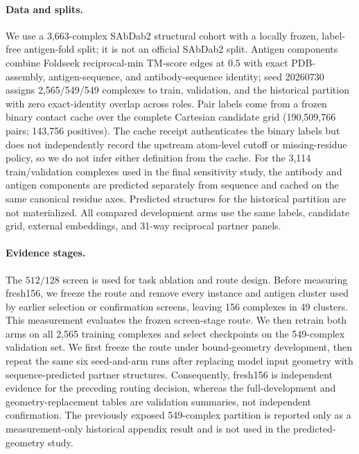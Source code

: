 \documentclass[10pt]{article}
\begin{document}
\paragraph{Data and splits.}
We use a 3,663-complex SAbDab2 structural cohort \citep{capel2026sabdab2} with a
locally frozen, label-free antigen-fold split; it is not an official SAbDab2
split. Antigen components combine Foldseek reciprocal-min TM-score edges at
$0.5$ with exact PDB-assembly, antigen-sequence, and antibody-sequence identity;
seed 20260730 assigns 2,565/549/549 complexes to train, validation, and the
historical partition with zero exact-identity overlap across roles. Pair labels
come from a frozen binary contact cache over the complete Cartesian candidate
grid (190,509,766 pairs; 143,756 positives). The cache receipt authenticates the
binary labels but does not independently record the upstream atom-level cutoff
or missing-residue policy, so we do not infer either definition from the cache.
For the 3,114 train/validation complexes used in the final sensitivity study,
the antibody and antigen components are predicted separately from sequence and
cached on the same canonical residue axes. Predicted structures for the
historical partition are not materialized. All compared development arms use
the same labels, candidate grid, external embeddings, and 31-way reciprocal
partner panels.

\paragraph{Evidence stages.}
The $512/128$ screen is used for task ablation and route design. Before measuring
fresh156, we freeze the route and remove every instance and antigen cluster used
by earlier selection or confirmation screens, leaving 156 complexes in 49
clusters. This measurement evaluates the frozen screen-stage route. We then
retrain both arms on all 2,565 training complexes and select checkpoints on the
549-complex validation set. We first freeze the route under bound-geometry
development, then repeat the same six seed-and-arm runs after replacing model
input geometry with sequence-predicted partner structures. Consequently,
fresh156 is independent evidence for the preceding routing decision, whereas
the full-development and geometry-replacement tables are validation summaries,
not independent confirmation. The previously exposed 549-complex partition is
reported only as a measurement-only historical appendix result and is not used
in the predicted-geometry study.
\end{document}
